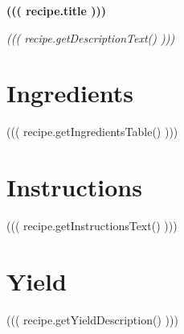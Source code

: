 

    \begin{center}
        {\Large \textbf{((( recipe.title )))}}
        
        \small\emph{((( recipe.getDescriptionText() )))}
    \end{center}
    
    \section*{Ingredients}
    \begin{center}
        ((( recipe.getIngredientsTable() )))
    \end{center}
    
    \section*{Instructions}
    ((( recipe.getInstructionsText() )))
    
    \section*{Yield}
    ((( recipe.getYieldDescription() )))


